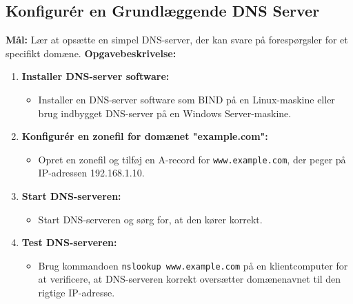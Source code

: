 \subsection{Konfigurér en Grundlæggende DNS Server}
\textbf{Mål:} Lær at opsætte en simpel DNS-server, der kan svare på forespørgsler for et specifikt domæne.
\newline\newline\noindent
\textbf{Opgavebeskrivelse:}
\begin{enumerate}
	\item \textbf{Installer DNS-server software:}
	\begin{itemize}
		\item Installer en DNS-server software som BIND på en Linux-maskine eller brug indbygget DNS-server på en Windows Server-maskine.
	\end{itemize}
	\item \textbf{Konfigurér en zonefil for domænet "example.com":}
	\begin{itemize}
		\item Opret en zonefil og tilføj en A-record for \texttt{www.example.com}, der peger på IP-adressen 192.168.1.10.
	\end{itemize}
	\item \textbf{Start DNS-serveren:}
	\begin{itemize}
		\item Start DNS-serveren og sørg for, at den kører korrekt.
	\end{itemize}
	\item \textbf{Test DNS-serveren:}
	\begin{itemize}
		\item Brug kommandoen \texttt{nslookup www.example.com} på en klientcomputer for at verificere, at DNS-serveren korrekt oversætter domænenavnet til den rigtige IP-adresse.
	\end{itemize}
\end{enumerate}

